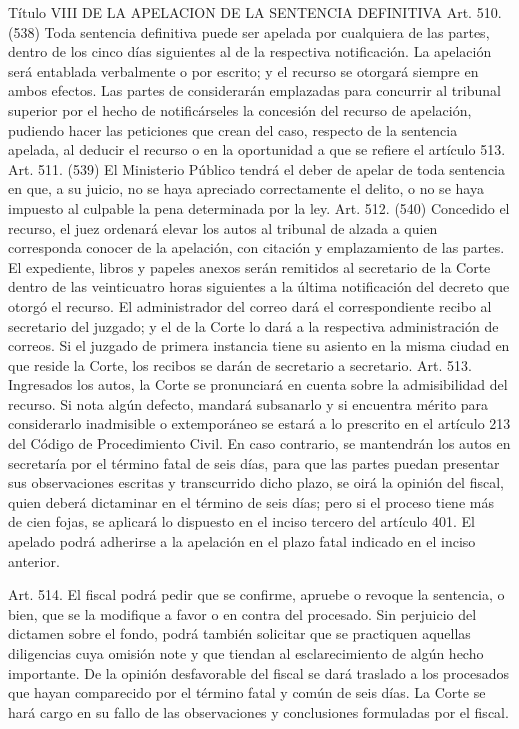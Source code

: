     Título VIII
    DE LA APELACION DE LA SENTENCIA DEFINITIVA
    Art. 510. (538) Toda sentencia definitiva puede ser apelada por cualquiera de las partes, dentro de los cinco días siguientes al de la respectiva notificación.
    La apelación será entablada verbalmente o por escrito; y el recurso se otorgará siempre en ambos efectos.
    Las partes de considerarán emplazadas para concurrir al tribunal superior por el hecho de notificárseles la concesión del recurso de apelación, pudiendo hacer las peticiones que crean del caso, respecto de la sentencia apelada, al deducir el recurso o en la oportunidad a que se refiere el artículo 513.
    Art. 511. (539) El Ministerio Público tendrá el deber de apelar de toda sentencia en que, a su juicio, no se haya apreciado correctamente el delito, o no se haya impuesto al culpable la pena determinada por la ley.
    Art. 512. (540) Concedido el recurso, el juez ordenará elevar los autos al tribunal de alzada a quien corresponda conocer de la apelación, con citación y emplazamiento de las partes.
    El expediente, libros y papeles anexos serán remitidos al secretario de la Corte dentro de las veinticuatro horas siguientes a la última notificación del decreto que otorgó el recurso. El administrador del correo dará el correspondiente recibo al secretario del juzgado; y el de la Corte lo dará a la respectiva administración de correos. Si el juzgado de primera instancia tiene su asiento en la misma ciudad en que reside la Corte, los recibos se darán de secretario a secretario.
    Art. 513. Ingresados los autos, la Corte se pronunciará en cuenta sobre la admisibilidad del recurso. Si nota algún defecto, mandará subsanarlo y si encuentra mérito para considerarlo inadmisible o extemporáneo se estará a lo prescrito en el artículo 213 del Código de Procedimiento Civil.
    En caso contrario, se mantendrán los autos en secretaría por el término fatal de seis días, para que las partes puedan presentar sus observaciones escritas y transcurrido dicho plazo, se oirá la opinión del fiscal, quien deberá dictaminar en el término de seis días; pero si el proceso tiene más de cien fojas, se aplicará lo dispuesto en el inciso tercero del artículo 401.
    El apelado podrá adherirse a la apelación en el plazo fatal indicado en el inciso anterior.

    Art. 514. El fiscal podrá pedir que se confirme, apruebe o revoque la sentencia, o bien, que se la modifique a favor o en contra del procesado.
    Sin perjuicio del dictamen sobre el fondo, podrá también solicitar que se practiquen aquellas diligencias cuya omisión note y que tiendan al esclarecimiento de algún hecho importante.
    De la opinión desfavorable del fiscal se dará traslado a los procesados que hayan comparecido por el término fatal y común de seis días.
    La Corte se hará cargo en su fallo de las observaciones y conclusiones formuladas por el fiscal.



